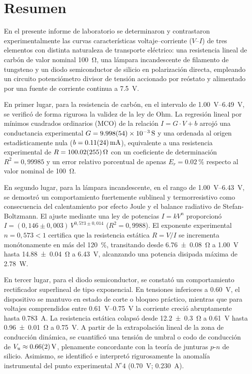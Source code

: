 
\section{Resumen}
\label{sec:resumen}

En el presente informe de laboratorio se determinaron y contrastaron experimentalmente las curvas características voltaje--corriente ($V$--$I$) de tres elementos con distinta naturaleza de transporte eléctrico: una resistencia lineal de carbón de valor nominal \qty{100}{\ohm}, una lámpara incandescente de filamento de tungsteno y un diodo semiconductor de silicio en polarización directa, empleando un circuito potenciómetro divisor de tensión accionado por reóstato y alimentado por una fuente de corriente continua a \qty{7,5}{\volt}.

En primer lugar, para la resistencia de carbón, en el intervalo de \qtyrange{1,00}{6,49}{\volt}, se verificó de forma rigurosa la validez de la ley de Ohm. La regresión lineal por mínimos cuadrados ordinarios (MCO) de la relación $I = G \cdot V + b$ arrojó una conductancia experimental $G = \qty{9,998 \pm 0,054e-3}{\siemens}$ y una ordenada al origen estadísticamente nula ($b = \qty{0,11 \pm 0,24}{\milli\ampere}$), equivalente a una resistencia experimental de $R = \qty{100,02 \pm 2,55}{\ohm}$ con un coeficiente de determinación $R^2 = 0{,}99985$ y un error relativo porcentual de apenas $E_r = \qty{0,02}{\percent}$ respecto al valor nominal de \qty{100}{\ohm}.

En segundo lugar, para la lámpara incandescente, en el rango de \qtyrange{1,00}{6,43}{\volt}, se demostró un comportamiento fuertemente sublineal y termorresistivo como consecuencia del calentamiento por efecto Joule y el balance radiativo de Stefan-Boltzmann. El ajuste mediante una ley de potencias $I = k V^n$ proporcionó $I = (0{,}146 \pm 0{,}003)\,V^{0{,}573 \pm 0{,}014}$ ($R^2 = 0{,}9988$). El exponente experimental $n = 0{,}573 < 1$ certifica que la resistencia estática $R = V/I$ se incrementa monótonamente en más del \qty{120}{\percent}, transitando desde \qty{6,76 \pm 0,08}{\ohm} a \qty{1,00}{\volt} hasta \qty{14,88 \pm 0,04}{\ohm} a \qty{6,43}{\volt}, alcanzando una potencia disipada máxima de \qty{2,78}{\watt}.

En tercer lugar, para el diodo semiconductor, se constató un comportamiento rectificador superlineal de tipo exponencial. En tensiones inferiores a \qty{0,60}{\volt}, el dispositivo se mantuvo en estado de corte o bloqueo práctico, mientras que para voltajes comprendidos entre \qtyrange{0,61}{0,75}{\volt} la corriente creció abruptamente hasta \qty{0,783}{\ampere}. La resistencia estática colapsó desde \qty{12,2 \pm 0,3}{\ohm} a \qty{0,61}{\volt} hasta \qty{0,96 \pm 0,01}{\ohm} a \qty{0,75}{\volt}. A partir de la extrapolación lineal de la zona de conducción dinámica, se cuantificó una tensión de umbral o codo de conducción de $V_u \approx \qty{0,66 \pm 0,02}{\volt}$, plenamente concordante con la teoría de junturas $p$-$n$ de silicio. Asimismo, se identificó e interpretó rigurosamente la anomalía instrumental del punto experimental $N^\circ 4$ (\qty{0,70}{\volt}; \qty{0,230}{\ampere}).
